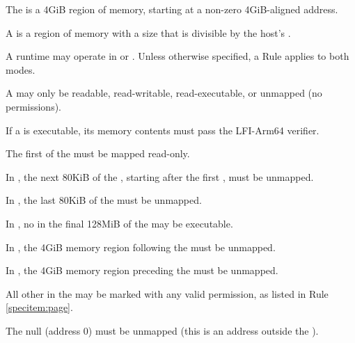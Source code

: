 


\specitem
The  is a 4GiB region of memory, starting at a non-zero 4GiB-aligned address.

\specitem
A  is a region of memory with a size that is divisible by the host's
.


\specitem
A runtime may operate in  or . Unless otherwise specified, a Rule applies to both modes.


\specitem
\label{specitem:page}
A  may only be readable, read-writable, read-executable, or unmapped
(no permissions).


\specitem
If a  is executable, its memory contents must pass the LFI-Arm64 verifier.

\specitem
The first  of the  must be mapped read-only.

\specitem
In , the next 80KiB of the , starting after
the first , must be unmapped.

\specitem
In , the last 80KiB of the  must be unmapped.

\specitem
In , no  in the final 128MiB of the  may be executable.

\specitem
In , the 4GiB memory region following the  must be unmapped.

\specitem
In , the 4GiB memory region preceding the  must be unmapped.

\specitem
All other  in the  may be marked with any valid permission, as listed in Rule \ref{specitem:page}.

\specitem
The null  (address 0) must be unmapped (this is an address outside the ).

